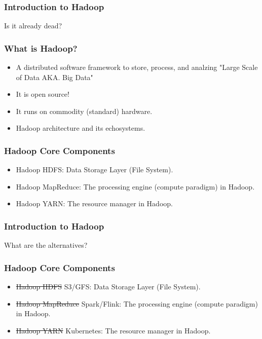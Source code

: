 \begin{frame}[c]{ }
		\frametitle{Introduction to Hadoop }
	\centering     
	
	\textcolor{offgreen}{ \large Is it already dead?}
\end{frame}
\begin{frame}
	\frametitle{What is Hadoop? }
	\begin{itemize}  [<+->]
		\item A distributed software framework to store, process, and analzing "Large Scale of Data AKA. Big Data"
		\item It is open source!
		\item It runs on commodity (standard) hardware.
		\item Hadoop architecture and its echosystems.		
	\end{itemize}
\end{frame}
\begin{frame}
	\frametitle{Hadoop Core Components }
	\begin{itemize}  [<+->]
		
		\item Hadoop HDFS: Data Storage Layer (File System).
		\item Hadoop MapReduce: The processing engine (compute paradigm) in Hadoop.
		\item Hadoop YARN: The resource manager in Hadoop.
		
	\end{itemize}
\end{frame}
\begin{frame}[c]{ }
	\frametitle{Introduction to Hadoop }
	\centering     
	
	\textcolor{offgreen}{ \large What are the alternatives?}
\end{frame}
\begin{frame}
	\frametitle{Hadoop Core Components }
	\begin{itemize}  
		
		\item \sout{Hadoop HDFS} \textcolor{offyellow}{S3/GFS}:  Data Storage Layer (File System).
		\item \sout{Hadoop MapReduce} \textcolor{offyellow}{Spark/Flink}: The processing engine (compute paradigm) in Hadoop.
		\item \sout{Hadoop YARN} \textcolor{offyellow}{Kubernetes}: The resource manager in Hadoop.
	\end{itemize}
\end{frame}
